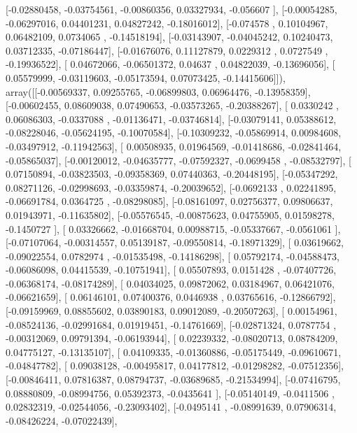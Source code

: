\documentclass{article}
\begin{document}
       [-0.02880458, -0.03754561, -0.00860356,  0.03327934, -0.056607  ],
       [-0.00054285, -0.06297016,  0.04401231,  0.04827242, -0.18016012],
       [-0.074578  ,  0.10104967,  0.06482109,  0.0734065 , -0.14518194],
       [-0.03143907, -0.04045242,  0.10240473,  0.03712335, -0.07186447],
       [-0.01676076,  0.11127879,  0.0229312 ,  0.0727549 , -0.19936522],
       [ 0.04672066, -0.06501372,  0.04637   ,  0.04822039, -0.13696056],
       [ 0.05579999, -0.03119603, -0.05173594,  0.07073425, -0.14415606]]), array([[-0.00569337,  0.09255765, -0.06899803,  0.06964476, -0.13958359],
       [-0.00602455,  0.08609038,  0.07490653, -0.03573265, -0.20388267],
       [ 0.0330242 ,  0.06086303, -0.0337088 , -0.01136471, -0.03746814],
       [-0.03079141,  0.05388612, -0.08228046, -0.05624195, -0.10070584],
       [-0.10309232, -0.05869914,  0.00984608, -0.03497912, -0.11942563],
       [ 0.00508935,  0.01964569, -0.01418686, -0.02841464, -0.05865037],
       [-0.00120012, -0.04635777, -0.07592327, -0.0699458 , -0.08532797],
       [ 0.07150894, -0.03823503, -0.09358369,  0.07440363, -0.20448195],
       [-0.05347292,  0.08271126, -0.02998693, -0.03359874, -0.20039652],
       [-0.0692133 ,  0.02241895, -0.06691784,  0.0364725 , -0.08298085],
       [-0.08161097,  0.02756377,  0.09806637,  0.01943971, -0.11635802],
       [-0.05576545, -0.00875623,  0.04755905,  0.01598278, -0.1450727 ],
       [ 0.03326662, -0.01668704,  0.00988715, -0.05337667, -0.0561061 ],
       [-0.07107064, -0.00314557,  0.05139187, -0.09550814, -0.18971329],
       [ 0.03619662, -0.09022554,  0.0782974 , -0.01535498, -0.14186298],
       [ 0.05792174, -0.04588473, -0.06086098,  0.04415539, -0.10751941],
       [ 0.05507893,  0.0151428 , -0.07407726, -0.06368174, -0.08174289],
       [ 0.04034025,  0.09872062,  0.03184967,  0.06421076, -0.06621659],
       [ 0.06146101,  0.07400376,  0.0446938 ,  0.03765616, -0.12866792],
       [-0.09159969,  0.08855602,  0.03890183,  0.09012089, -0.20507263],
       [ 0.00154961, -0.08524136, -0.02991684,  0.01919451, -0.14761669],
       [-0.02871324,  0.0787754 , -0.00312069,  0.09791394, -0.06193944],
       [ 0.02239332, -0.08020713,  0.08784209,  0.04775127, -0.13135107],
       [ 0.04109335, -0.01360886, -0.05175449, -0.09610671, -0.04847782],
       [ 0.09038128, -0.00495817,  0.04177812, -0.01298282, -0.07512356],
       [-0.00846411,  0.07816387,  0.08794737, -0.03689685, -0.21534994],
       [-0.07416795,  0.08880809, -0.08994756,  0.05392373, -0.0435641 ],
       [-0.05140149, -0.0411506 ,  0.02832319, -0.02544056, -0.23093402],
       [-0.0495141 , -0.08991639,  0.07906314, -0.08426224, -0.07022439],
\end{document}

